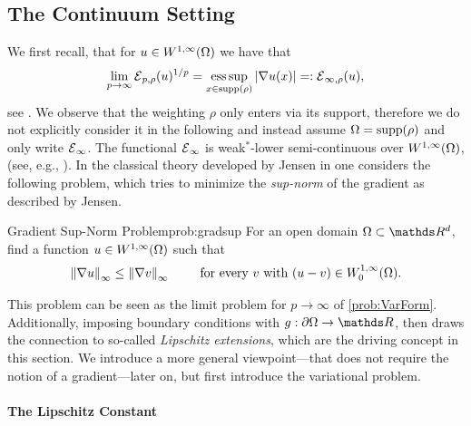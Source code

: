 \subsection{The Continuum Setting}\label{sec:LipExtCont}
%
%
We first recall, that for 
$u\in W^{1,\infty}(\Omega)$ we have that
%
\begin{align*}
\lim_{p\to\infty} \mathcal{E}{}_{p,\rho}(u)^{1/p} = \operatorname*{ess\,sup}_{x\in\mathrm{supp}(\rho)} \left|\nabla u(x)\right| =: \mathcal{E}{}_{\infty,\rho}(u),
\end{align*}
%
see \cite{jensen1993uniqueness}. We observe that the weighting $\rho$ only enters via its support, therefore we do not explicitly consider it in the following and instead assume $\Omega=\mathrm{supp}(\rho)$ and only write $\mathcal{E}{}_{\infty}$. The functional $\mathcal{E}{}_\infty$ is weak$^*$-lower semi-continuous over $W^{1,\infty}(\Omega)$, (see, e.g., \cite[Thm. 2.6]{barron2001lower}). In the classical theory developed by Jensen in \cite{jensen1993uniqueness} one considers the following problem, which tries to minimize the \emph{sup-norm} of the gradient as described by Jensen.
%
\begin{problem}{Gradient Sup-Norm Problem}{prob:gradsup}
For an open domain $\domain\subset\R^d$, find a function $u\in W^{1,\infty}(\Omega)$ such that
%
\begin{align*}
\left\|\nabla u\right\|_\infty \leq \left\|\nabla v\right\|_\infty \qquad\text{ for every } v \text{ with } (u-v)\in W^{1,\infty}_0(\Omega).
\end{align*}
\end{problem}
%
\noindent%
This problem can be seen as the limit problem for $p\to\infty$ of \cref{prob:VarForm}. Additionally, imposing boundary conditions with $g:\partial\domain\to\R$, \cite{jensen1993uniqueness} then draws the connection to so-called \emph{Lipschitz extensions}, which are the driving concept in this section. We introduce a more general viewpoint---that does not require the notion of a gradient---later on, but first introduce the variational problem. 

\paragraph{The Lipschitz Constant}

